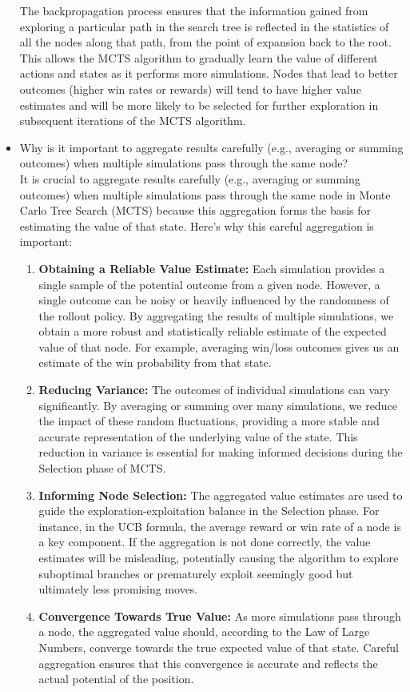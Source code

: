 \begin{itemize}
The backpropagation process ensures that the information gained from exploring a particular path in the search tree is reflected in the statistics of all the nodes along that path, from the point of expansion back to the root. This allows the MCTS algorithm to gradually learn the value of different actions and states as it performs more simulations. Nodes that lead to better outcomes (higher win rates or rewards) will tend to have higher value estimates and will be more likely to be selected for further exploration in subsequent iterations of the MCTS algorithm.
    \item Why is it important to aggregate results carefully (e.g., averaging or summing outcomes) when multiple simulations pass through the same node?\\
    It is crucial to aggregate results carefully (e.g., averaging or summing outcomes) when multiple simulations pass through the same node in Monte Carlo Tree Search (MCTS) because this aggregation forms the basis for estimating the value of that state. Here's why this careful aggregation is important:

\begin{enumerate}
    \item \textbf{Obtaining a Reliable Value Estimate:} Each simulation provides a single sample of the potential outcome from a given node. However, a single outcome can be noisy or heavily influenced by the randomness of the rollout policy. By aggregating the results of multiple simulations, we obtain a more robust and statistically reliable estimate of the expected value of that node. For example, averaging win/loss outcomes gives us an estimate of the win probability from that state.
    \item \textbf{Reducing Variance:} The outcomes of individual simulations can vary significantly. By averaging or summing over many simulations, we reduce the impact of these random fluctuations, providing a more stable and accurate representation of the underlying value of the state. This reduction in variance is essential for making informed decisions during the Selection phase of MCTS.
    \item \textbf{Informing Node Selection:} The aggregated value estimates are used to guide the exploration-exploitation balance in the Selection phase. For instance, in the UCB formula, the average reward or win rate of a node is a key component. If the aggregation is not done correctly, the value estimates will be misleading, potentially causing the algorithm to explore suboptimal branches or prematurely exploit seemingly good but ultimately less promising moves.
    \item \textbf{Convergence Towards True Value:} As more simulations pass through a node, the aggregated value should, according to the Law of Large Numbers, converge towards the true expected value of that state. Careful aggregation ensures that this convergence is accurate and reflects the actual potential of the position.
\end{enumerate}


\end{itemize}
